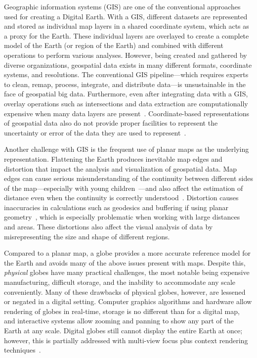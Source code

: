 Geographic information systems (GIS) are one of the conventional approaches used for creating a Digital Earth.
With a GIS, different datasets are represented and stored as individual map layers in a shared coordinate system, which acts as a proxy for the Earth.
These individual layers are overlayed to create a complete model of the Earth (or region of the Earth) and combined with different operations to perform various analyses.
However, being created and gathered by diverse organizations, geospatial data exists in many different formats, coordinate systems, and resolutions.
The conventional GIS pipeline---which requires experts to clean, remap, process, integrate, and distribute data---is unsustainable in the face of geospatial big data.
Furthermore, even after integrating data with a GIS, overlay operations such as intersections and data extraction are computationally expensive when many data layers are present~\cite{wang2015improving}.
Coordinate-based representations of geospatial data also do not provide proper facilities to represent the uncertainty or error of the data they are used to represent~\cite{goodchild2018reimagining}.


Another challenge with GIS is the frequent use of planar maps as the underlying representation.
Flattening the Earth produces inevitable map edges and distortion that impact the analysis and visualization of geospatial data.
Map edges can cause serious misunderstanding of the continuity between different sides of the map---especially with young children~\cite{hennerdal2015beyond}---and also affect the estimation of distance even when the continuity is correctly understood~\cite{hruby2016journey}.
Distortion causes inaccuracies in calculations such as geodesics and buffering if using planar geometry~\cite{flaterbuffering}, which is especially problematic when working with large distances and areas.
These distortions also affect the visual analysis of data by misrepresenting the size and shape of different regions.


Compared to a planar map, a globe provides a more accurate reference model for the Earth and avoids many of the above issues present with maps.
Despite this, \textit{physical} globes have many practical challenges, the most notable being expensive manufacturing, difficult storage, and the inability to accommodate any scale conveniently.
Many of these drawbacks of physical globes, however, are lessened or negated in a digital setting.
Computer graphics algorithms and hardware allow rendering of globes in real-time, storage is no different than for a digital map, and interactive systems allow zooming and panning to show any part of the Earth at any scale.
Digital globes still cannot display the entire Earth at once; however, this is partially addressed with multi-view focus plus context rendering techniques~\cite{sherlock2017visualizations}.


